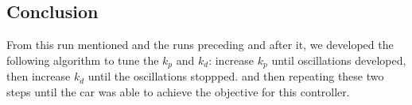 \documentclass[12pt]{article}
\begin{document}
\begin{multicols}{2}
\section*{Conclusion}
From this run mentioned and the runs preceding and after it, we developed the following algorithm to tune the
$k_p$ and $k_d$: increase $k_p$ until oscillations developed, then increase $k_d$ until the oscillations stoppped.
and then repeating these two steps until the car was able to achieve the objective for this controller.
\end{multicols}
\end{document}
